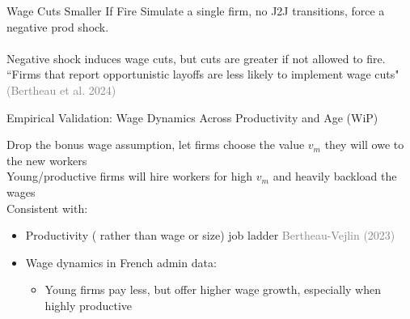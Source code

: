 \documentclass[9pt,aspectratio=169]{beamer} %
\begin{document}
\begin{frame}{Wage Cuts Smaller If Fire}
Simulate a single firm, no J2J transitions, force a negative prod shock. \\
\\
Negative shock induces wage cuts, but cuts are greater if not allowed to fire. \\
``Firms that report opportunistic layoffs are less likely to implement wage cuts" \textcolor{gray}{(Bertheau et al. 2024)}
\end{frame}

\begin{frame}{Empirical Validation: Wage Dynamics Across Productivity and Age (WiP)}

Drop the bonus wage assumption, let firms choose the value $v_m$ they will owe to the new workers \\
\vspace{5pt}
Young/productive firms will hire workers for high $v_m$ and heavily backload the wages \\
\vspace{5pt}
Consistent with:
\begin{itemize}
    \item Productivity ( rather than wage or size) job ladder \textcolor{gray}{Bertheau-Vejlin (2023)}
    \vspace{5pt}
    \item Wage dynamics in French admin data: 
    \begin{itemize}
        \item Young firms pay less, but offer higher wage growth, especially when highly productive
        \end{itemize}
\end{itemize}
\end{frame}
\end{document}
